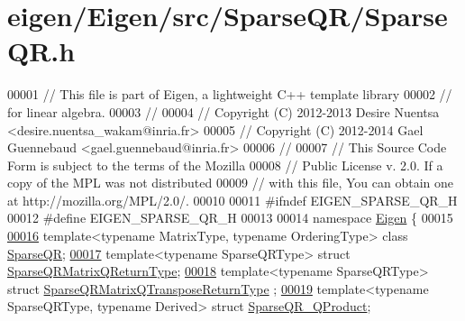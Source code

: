 \hypertarget{eigen_2_eigen_2src_2_sparse_q_r_2_sparse_q_r_8h_source}{}\section{eigen/\+Eigen/src/\+Sparse\+Q\+R/\+Sparse\+QR.h}
\label{eigen_2_eigen_2src_2_sparse_q_r_2_sparse_q_r_8h_source}

\begin{DoxyCode}
00001 \textcolor{comment}{// This file is part of Eigen, a lightweight C++ template library}
00002 \textcolor{comment}{// for linear algebra.}
00003 \textcolor{comment}{//}
00004 \textcolor{comment}{// Copyright (C) 2012-2013 Desire Nuentsa <desire.nuentsa\_wakam@inria.fr>}
00005 \textcolor{comment}{// Copyright (C) 2012-2014 Gael Guennebaud <gael.guennebaud@inria.fr>}
00006 \textcolor{comment}{//}
00007 \textcolor{comment}{// This Source Code Form is subject to the terms of the Mozilla}
00008 \textcolor{comment}{// Public License v. 2.0. If a copy of the MPL was not distributed}
00009 \textcolor{comment}{// with this file, You can obtain one at http://mozilla.org/MPL/2.0/.}
00010 
00011 \textcolor{preprocessor}{#ifndef EIGEN\_SPARSE\_QR\_H}
00012 \textcolor{preprocessor}{#define EIGEN\_SPARSE\_QR\_H}
00013 
00014 \textcolor{keyword}{namespace }\hyperlink{namespace_eigen}{Eigen} \{
00015 
\hyperlink{group___sparse_q_r___module}{00016} \textcolor{keyword}{template}<\textcolor{keyword}{typename} MatrixType, \textcolor{keyword}{typename} OrderingType> \textcolor{keyword}{class }\hyperlink{group___sparse_q_r___module_class_eigen_1_1_sparse_q_r}{SparseQR};
\hyperlink{struct_eigen_1_1_sparse_q_r_matrix_q_return_type}{00017} \textcolor{keyword}{template}<\textcolor{keyword}{typename} SparseQRType> \textcolor{keyword}{struct }\hyperlink{struct_eigen_1_1_sparse_q_r_matrix_q_return_type}{SparseQRMatrixQReturnType};
\hyperlink{struct_eigen_1_1_sparse_q_r_matrix_q_transpose_return_type}{00018} \textcolor{keyword}{template}<\textcolor{keyword}{typename} SparseQRType> \textcolor{keyword}{struct }\hyperlink{struct_eigen_1_1_sparse_q_r_matrix_q_transpose_return_type}{SparseQRMatrixQTransposeReturnType}
      ;
\hyperlink{struct_eigen_1_1_sparse_q_r___q_product}{00019} \textcolor{keyword}{template}<\textcolor{keyword}{typename} SparseQRType, \textcolor{keyword}{typename} Derived> \textcolor{keyword}{struct }\hyperlink{struct_eigen_1_1_sparse_q_r___q_product}{SparseQR\_QProduct};

\end{DoxyCode}
